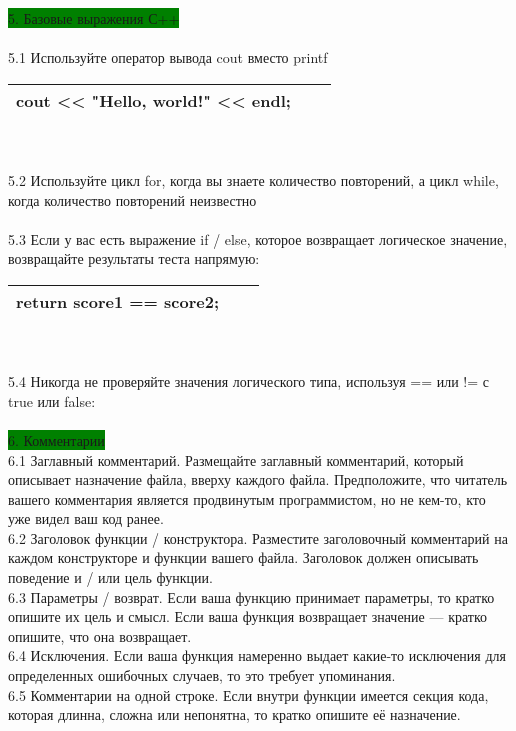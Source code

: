 \documentclass{article}
\begin{document}
\colorbox{green}{5. Базовые выражения С++}
\\\\
5.1 Используйте оператор вывода cout вместо printf
\\
\begin{tabular}{ | l | l | l | }
\hline
cout << "Hello, world!" << endl; \\
\hline
\end{tabular}
\\\\
5.2 Используйте цикл for, когда вы знаете количество повторений, а цикл while, когда количество повторений неизвестно
\\\\
5.3 Если у вас есть выражение if / else, которое возвращает логическое значение, возвращайте результаты теста напрямую:
\\
\begin{tabular}{ | l | l | l | }
\hline
return score1 == score2; \\
\hline
\end{tabular}
\\\\
5.4 Никогда не проверяйте значения логического типа, используя == или != с true или false:
\\\\
\colorbox{green}{6. Комментарии}\\

6.1 Заглавный комментарий. Размещайте заглавный комментарий, который описывает назначение файла, вверху каждого файла. Предположите, что читатель вашего комментария является продвинутым программистом, но не кем-то, кто уже видел ваш код ранее.\\

6.2 Заголовок функции / конструктора. Разместите заголовочный комментарий на каждом конструкторе и функции вашего файла. Заголовок должен описывать поведение и / или цель функции.\\

6.3 Параметры / возврат. Если ваша функцию принимает параметры, то кратко опишите их цель и смысл. Если ваша функция возвращает значение — кратко опишите, что она возвращает.\\

6.4 Исключения. Если ваша функция намеренно выдает какие-то исключения для определенных ошибочных случаев, то это требует упоминания.\\

6.5 Комментарии на одной строке. Если внутри функции имеется секция кода, которая длинна, сложна или непонятна, то кратко опишите её назначение.\\
\end{document}
